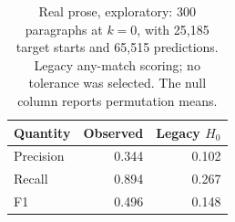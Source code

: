 \begin{table}[t]
\centering
\begin{tabular}{lrr}
\toprule
Quantity & Observed & Legacy $H_0$ \\
\midrule
Precision & 0.344 & 0.102 \\
Recall & 0.894 & 0.267 \\
F1 & 0.496 & 0.148 \\
\bottomrule
\end{tabular}
\caption{Real prose, exploratory: 300 paragraphs at $k=0$, with 25,185 target starts and 65,515 predictions. Legacy any-match scoring; no tolerance was selected. The null column reports permutation means.}
\label{tab:prose}
\end{table}
